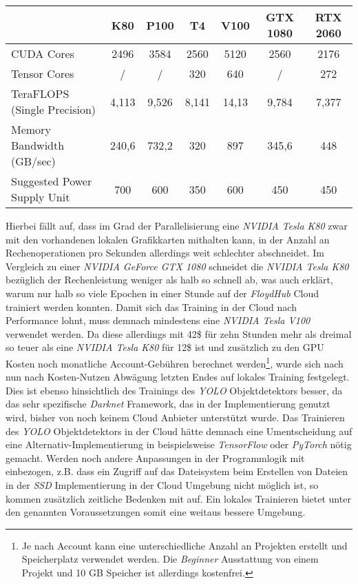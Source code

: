 \begin{center}
	\begin{tabular}[h]{l|c|c|c|c|c|c}
		& K80 & P100 & T4 & V100 & GTX 1080 & RTX 2060 \\
		\hline
		CUDA Cores & 2496 & 3584 & 2560 & 5120 & 2560 & 2176 \\
		Tensor Cores & / & / & 320 & 640 & / & 272 \\
		TeraFLOPS (Single Precision) & 4,113 & 9,526 & 8,141 & 14,13 & 9,784 & 7,377 \\
		Memory Bandwidth (GB/sec) & 240,6 & 732,2 & 320 & 897 & 345,6 & 448 \\
		Suggested Power Supply Unit & 700 & 600 & 350 & 600 & 450 & 450
	\end{tabular}
	\label{table:hardware}
\end{center}

Hierbei fällt auf, dass im Grad der Parallelisierung eine \textit{NVIDIA Tesla K80} zwar mit den vorhandenen lokalen Grafikkarten mithalten kann, in der Anzahl an Rechenoperationen pro Sekunden allerdings weit schlechter abschneidet. Im Vergleich zu einer \textit{NVIDIA GeForce GTX 1080} schneidet die \textit{NVIDIA Tesla K80} bezüglich der Rechenleistung weniger als halb so schnell ab, was auch erklärt, warum nur halb so viele Epochen in einer Stunde auf der \textit{FloydHub} Cloud trainiert werden konnten. Damit sich das Training in der Cloud nach Performance lohnt, muss demnach mindestens eine \textit{NVIDIA Tesla V100} verwendet werden. Da diese allerdings mit 42\$ für zehn Stunden mehr als dreimal so teuer als eine \textit{NVIDIA Tesla K80} für 12\$ ist und zusätzlich zu den GPU Kosten noch monatliche Account-Gebühren berechnet werden\footnote{Je nach Account kann eine unterschiedliche Anzahl an Projekten erstellt und Speicherplatz verwendet werden. Die \textit{Beginner} Ausstattung von einem Projekt und 10 GB Speicher ist allerdings kostenfrei.}, wurde sich nach nun nach Kosten-Nutzen Abwägung letzten Endes auf lokales Training festgelegt. Dies ist ebenso hinsichtlich des Trainings des \textit{YOLO} Objektdetektors besser, da das sehr spezifische \textit{Darknet} Framework, das in der Implementierung genutzt wird, bisher von noch keinem Cloud Anbieter unterstützt wurde. Das Trainieren des \textit{YOLO} Objektdetektors in der Cloud hätte demnach eine Umentscheidung auf eine Alternativ-Implementierung in beispielsweise \textit{TensorFlow} oder \textit{PyTorch} nötig gemacht. Werden noch andere Anpassungen in der Programmlogik mit einbezogen, z.B. dass ein Zugriff auf das Dateisystem beim Erstellen von Dateien in der \textit{SSD} Implementierung in der Cloud Umgebung nicht möglich ist, so kommen zusätzlich zeitliche Bedenken mit auf. Ein lokales Trainieren bietet unter den genannten Voraussetzungen somit eine weitaus bessere Umgebung.

